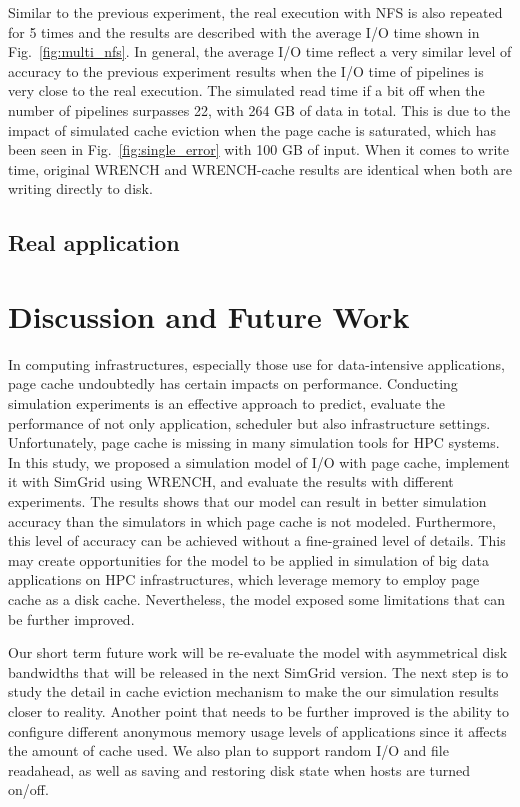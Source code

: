 \documentclass[conference]{IEEEtran}
\begin{document}
            Similar to the previous experiment, the real execution with NFS is also
            repeated for 5 times and the results are described with the average I/O time
            shown in Fig.~\ref{fig:multi_nfs}.
            In general, the average I/O time reflect a very similar level of accuracy
            to the previous experiment results when the I/O time of pipelines
            is very close to the real execution.
            The simulated read time if a bit off when the number of pipelines
            surpasses 22, with 264 GB of data in total.
            This is due to the impact of simulated cache eviction when
            the page cache is saturated, which has been seen in
            Fig.~\ref{fig:single_error} with 100 GB of input.
            When it comes to write time, original WRENCH and WRENCH-cache
            results are identical when both are writing directly to disk.

        \subsection{Real application}

    \section{Discussion and Future Work}
    \label{discussion}
        In computing infrastructures, especially those use for data-intensive applications,
        page cache undoubtedly has certain impacts on performance.
        Conducting simulation experiments is an effective approach to predict,
        evaluate the performance of not only application, scheduler but also
        infrastructure settings.
        Unfortunately, page cache is missing in many simulation tools for HPC systems.
        In this study, we proposed a simulation model of I/O with page cache,
        implement it with SimGrid using WRENCH, and evaluate the results
        with different experiments.
        The results shows that our model can result in better simulation accuracy than
        the simulators in which page cache is not modeled.
        Furthermore, this level of accuracy can be achieved without a fine-grained
        level of details.
        This may create opportunities for the model to be applied in simulation of
        big data applications on HPC infrastructures, which leverage memory to
        employ page cache as a disk cache.
        Nevertheless, the model exposed some limitations that can be
        further improved.

        Our short term future work will be re-evaluate the model with asymmetrical
        disk bandwidths that will be released in the next SimGrid version.
        The next step is to study the detail in cache eviction mechanism to make
        the our simulation results closer to reality.
        Another point that needs to be further improved is the ability to configure
        different anonymous memory usage levels of applications since it affects
        the amount of cache used.
        We also plan to support random I/O and file readahead, as well as
        saving and restoring disk state when hosts are turned on/off.



\end{document}
